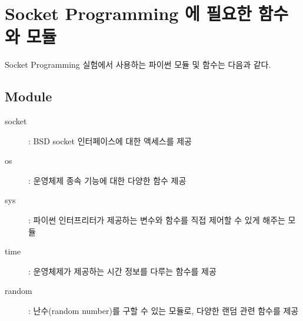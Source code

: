 \section{Socket Programming 에 필요한 함수와 모듈}
Socket Programming 실험에서 사용하는 파이썬 모듈 및 함수는 다음과 같다.
\begin{multicols}{2}
\subsection{Module}
\begin{description}
    \item[socket] : BSD socket 인터페이스에 대한 액세스를 제공 \vspace{-1mm}
    \item[os] : 운영체제 종속 기능에 대한 다양한 함수 제공 \vspace{-1mm}
    \item[sys] : 파이썬 인터프리터가 제공하는 변수와 함수를 직접 제어할 수 있게 해주는 모듈 \vspace{-1mm}
    \item[time] : 운영체제가 제공하는 시간 정보를 다루는 함수를 제공 \vspace{-1mm}
    \item[random] : 난수(random number)를 구할 수 있는 모듈로, 다양한 랜덤 관련 함수를 제공 \vspace{-1mm}
\end{description}

\end{multicols}
